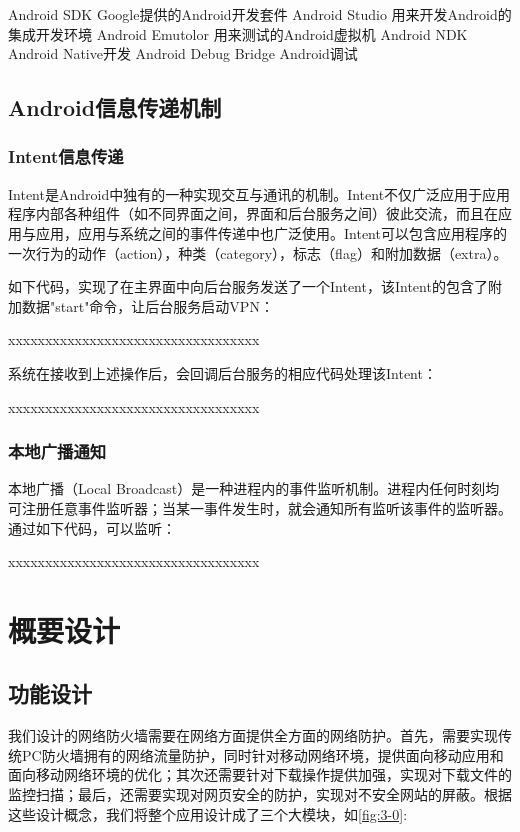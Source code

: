 \documentclass[format=final, language=chinese, degree=fyp]{hustthesis}
\begin{document}
Android SDK Google提供的Android开发套件
Android Studio 用来开发Android的集成开发环境
Android Emutolor 用来测试的Android虚拟机
Android NDK Android Native开发
Android Debug Bridge Android调试

\section{Android信息传递机制}

\subsection{Intent信息传递}

Intent是Android中独有的一种实现交互与通讯的机制。Intent不仅广泛应用于应用程序内部各种组件（如不同界面之间，界面和后台服务之间）彼此交流，而且在应用与应用，应用与系统之间的事件传递中也广泛使用。Intent可以包含应用程序的一次行为的动作（action），种类（category），标志（flag）和附加数据（extra）。

如下代码，实现了在主界面中向后台服务发送了一个Intent，该Intent的包含了附加数据"start"命令，让后台服务启动VPN：

    xxxxxxxxxxxxxxxxxxxxxxxxxxxxxxxxxx

系统在接收到上述操作后，会回调后台服务的相应代码处理该Intent：

    xxxxxxxxxxxxxxxxxxxxxxxxxxxxxxxxxx

\subsection{本地广播通知}

本地广播（Local Broadcast）是一种进程内的事件监听机制。进程内任何时刻均可注册任意事件监听器；当某一事件发生时，就会通知所有监听该事件的监听器。通过如下代码，可以监听：


    xxxxxxxxxxxxxxxxxxxxxxxxxxxxxxxxxx




\chapter{概要设计}

\section{功能设计}

我们设计的网络防火墙需要在网络方面提供全方面的网络防护。首先，需要实现传统PC防火墙拥有的网络流量防护，同时针对移动网络环境，提供面向移动应用和面向移动网络环境的优化；其次还需要针对下载操作提供加强，实现对下载文件的监控扫描；最后，还需要实现对网页安全的防护，实现对不安全网站的屏蔽。根据这些设计概念，我们将整个应用设计成了三个大模块，如\autoref{fig:3-0}:
\end{document}
